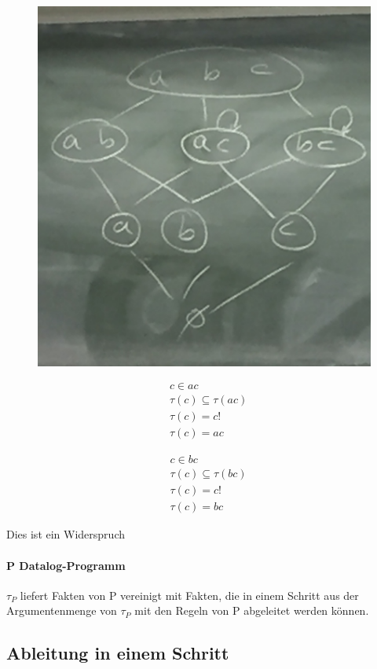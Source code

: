 \documentclass[12pt, a4paper]{article}
\begin{document}
\begin{figure}[h!]
\centering
\includegraphics[width=0.7\linewidth]{img/img1}
\caption{}
\label{fig:img1}
\end{figure}
\begin{equation}
\begin{split}
&c \in ac \\
&\tau(c) \subseteq \tau(ac) \\
&\tau(c) = c! \\ %
&\tau(c) = ac
\end{split}
\end{equation}

\begin{equation}
\begin{split}
&c \in bc \\
&\tau(c) \subseteq \tau(bc) \\
&\tau(c) = c! \\  %
&\tau(c) = bc
\end{split}
\end{equation}

Dies ist ein Widerspruch


\paragraph{P Datalog-Programm}
$\tau_P$ liefert Fakten von P vereinigt mit Fakten, die in einem Schritt aus der Argumentenmenge von $\tau_P$ mit den Regeln von P abgeleitet werden können.

\subsection*{Ableitung in einem Schritt}
\end{document}
